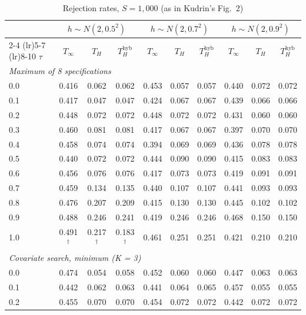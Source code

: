 \begin{table}[htbp]
\centering
\caption{Rejection rates, $S = 1{,}000$ (as in Kudrin's Fig.~2)}
\label{tab:kudrin_style_mean_dial_EKW_S1000}
\footnotesize
\setlength{\tabcolsep}{4pt}
\begin{tabular}{lccccccccc}
\toprule
 & \multicolumn{3}{c}{$h \sim N(2, 0.5^2)$} & \multicolumn{3}{c}{$h \sim N(2, 0.7^2)$} & \multicolumn{3}{c}{$h \sim N(2, 0.9^2)$} \\
\cmidrule(lr){2-4} \cmidrule(lr){5-7} \cmidrule(lr){8-10}
$\tau$ & $T_\infty$ & $T_H$ & $T_H^{\mathrm{hyb}}$ & $T_\infty$ & $T_H$ & $T_H^{\mathrm{hyb}}$ & $T_\infty$ & $T_H$ & $T_H^{\mathrm{hyb}}$ \\
\midrule
\multicolumn{10}{l}{\textit{Maximum of 8 specifications}} \\
0.0 & 0.416 & 0.062 & 0.062 & 0.453 & 0.057 & 0.057 & 0.440 & 0.072 & 0.072 \\
0.1 & 0.417 & 0.047 & 0.047 & 0.424 & 0.067 & 0.067 & 0.439 & 0.066 & 0.066 \\
0.2 & 0.448 & 0.072 & 0.072 & 0.448 & 0.072 & 0.072 & 0.431 & 0.060 & 0.060 \\
0.3 & 0.460 & 0.081 & 0.081 & 0.417 & 0.067 & 0.067 & 0.397 & 0.070 & 0.070 \\
0.4 & 0.458 & 0.074 & 0.074 & 0.394 & 0.069 & 0.069 & 0.436 & 0.078 & 0.078 \\
0.5 & 0.440 & 0.072 & 0.072 & 0.444 & 0.090 & 0.090 & 0.415 & 0.083 & 0.083 \\
0.6 & 0.456 & 0.076 & 0.076 & 0.417 & 0.073 & 0.073 & 0.419 & 0.091 & 0.091 \\
0.7 & 0.459 & 0.134 & 0.135 & 0.440 & 0.107 & 0.107 & 0.441 & 0.093 & 0.093 \\
0.8 & 0.476 & 0.207 & 0.209 & 0.415 & 0.130 & 0.130 & 0.445 & 0.102 & 0.102 \\
0.9 & 0.488 & 0.246 & 0.241 & 0.419 & 0.246 & 0.246 & 0.468 & 0.150 & 0.150 \\
1.0 & 0.491$^\dagger$ & 0.217$^\dagger$ & 0.183$^\dagger$ & 0.461 & 0.251 & 0.251 & 0.421 & 0.210 & 0.210 \\
\midrule
\multicolumn{10}{l}{\textit{Covariate search, minimum (K = 3)}} \\
0.0 & 0.474 & 0.054 & 0.058 & 0.452 & 0.060 & 0.060 & 0.447 & 0.063 & 0.063 \\
0.1 & 0.442 & 0.062 & 0.063 & 0.441 & 0.064 & 0.065 & 0.457 & 0.055 & 0.055 \\
0.2 & 0.455 & 0.070 & 0.070 & 0.454 & 0.072 & 0.072 & 0.442 & 0.072 & 0.072 \\

\end{tabular}
\end{table}
